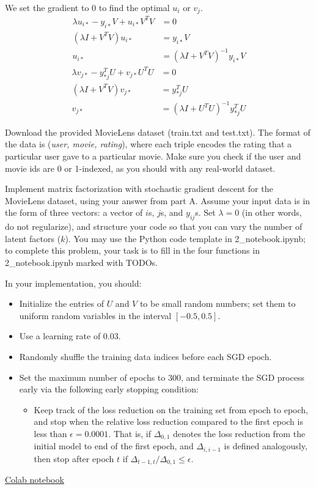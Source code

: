 \begin{solution}
	We set the gradient to 0 to find the optimal $u_i$ or $v_j$.
	\begin{align*}
		\lambda u_{i*} - y_{i*} V + u_{i*} V^T V &= 0 \\
		(\lambda I + V^T V) u_{i*} &= y_{i*} V \\
		u_{i*} &= (\lambda I + V^T V)^{-1} y_{i*} V
	\end{align*}
	\begin{align*}
		\lambda v_{j*} - y_{*j}^T U + v_{j*} U^T U &= 0 \\
		(\lambda I + V^T V) v_{j*} &= y_{*j}^T U \\
		v_{j*} &= (\lambda I + U^T U)^{-1} y_{*j}^T U
	\end{align*}
\end{solution}

\problem[10]Download the provided MovieLens dataset (train.txt and test.txt).  The format of the data is (\emph{user, movie, rating}), where each triple encodes the rating that a particular user gave to a particular movie. Make sure you check if the user and movie ids are 0 or 1-indexed, as you should with any real-world dataset.

Implement matrix factorization with stochastic gradient descent for the MovieLens dataset, using your answer from part A. Assume your input data is in the form of three vectors: a vector of $i$s, $j$s, and $y_{ij}$s. Set $\lambda = 0$ (in other words, do not regularize), and structure your code so that you can vary the number of latent factors ($k$). You may use the Python code template in 2_notebook.ipynb; to complete this problem, your task is to fill in the four functions in 2_notebook.ipynb marked with TODOs.

In your implementation, you should:

\begin{itemize}
\item Initialize the entries of $U$ and $V$ to be small random numbers; set them to uniform random variables in the interval $[-0.5, 0.5]$.
\item Use a learning rate of 0.03.
\item Randomly shuffle the training data indices before each SGD epoch.
\item Set the maximum number of epochs to 300, and terminate the SGD process early via the following early stopping condition:
\begin{itemize}
\item Keep track of the loss reduction on the training set from epoch to epoch, and stop when the relative loss reduction compared to the first epoch is less than $\epsilon = 0.0001$.  That is, if $\Delta_{0,1}$ denotes the loss reduction from the initial model to end of the first epoch, and $\Delta_{i, i-1}$ is defined analogously, then stop after epoch $t$ if $\Delta_{t-1,t} / \Delta_{0,1} \leq \epsilon$.
\end{itemize}
\end{itemize}
\begin{solution}
	\href{https://colab.research.google.com/drive/1IE2JHw4xb7s5HXLfgBix8hoHEycQTR4D?usp=sharing}{Colab notebook}
\end{solution}

